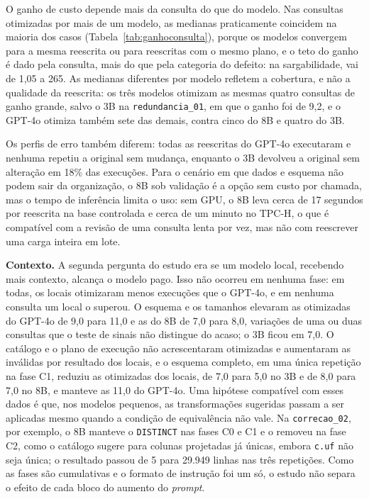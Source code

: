 \documentclass[12pt]{article}
\begin{document}
O ganho de custo depende mais da consulta do que do modelo. Nas consultas otimizadas por mais de um modelo, as medianas praticamente coincidem na maioria dos casos (Tabela~\ref{tab:ganhoconsulta}), porque os modelos convergem para a mesma reescrita ou para reescritas com o mesmo plano, e o teto do ganho é dado pela consulta, mais do que pela categoria do defeito: na sargabilidade, vai de 1,05 a 265. As medianas diferentes por modelo refletem a cobertura, e não a qualidade da reescrita: os três modelos otimizam as mesmas quatro consultas de ganho grande, salvo o 3B na \texttt{redundancia\_01}, em que o ganho foi de 9,2, e o GPT-4o otimiza também sete das demais, contra cinco do 8B e quatro do 3B.

Os perfis de erro também diferem: todas as reescritas do GPT-4o executaram e nenhuma repetiu a original sem mudança, enquanto o 3B devolveu a original sem alteração em 18\% das execuções. Para o cenário em que dados e esquema não podem sair da organização, o 8B sob validação é a opção sem custo por chamada, mas o tempo de inferência limita o uso: sem GPU, o 8B leva cerca de 17 segundos por reescrita na base controlada e cerca de um minuto no TPC-H, o que é compatível com a revisão de uma consulta lenta por vez, mas não com reescrever uma carga inteira em lote.

\textbf{Contexto.} A segunda pergunta do estudo era se um modelo local, recebendo mais contexto, alcança o modelo pago. Isso não ocorreu em nenhuma fase: em todas, os locais otimizaram menos execuções que o GPT-4o, e em nenhuma consulta um local o superou. O esquema e os tamanhos elevaram as otimizadas do GPT-4o de 9,0 para 11,0 e as do 8B de 7,0 para 8,0, variações de uma ou duas consultas que o teste de sinais não distingue do acaso; o 3B ficou em 7,0. O catálogo e o plano de execução não acrescentaram otimizadas e aumentaram as inválidas por resultado dos locais, e o esquema completo, em uma única repetição na fase C1, reduziu as otimizadas dos locais, de 7,0 para 5,0 no 3B e de 8,0 para 7,0 no 8B, e manteve as 11,0 do GPT-4o. Uma hipótese compatível com esses dados é que, nos modelos pequenos, as transformações sugeridas passam a ser aplicadas mesmo quando a condição de equivalência não vale. Na \texttt{correcao\_02}, por exemplo, o 8B manteve o \texttt{DISTINCT} nas fases C0 e C1 e o removeu na fase C2, como o catálogo sugere para colunas projetadas já únicas, embora \texttt{c.uf} não seja única; o resultado passou de 5 para 29.949 linhas nas três repetições. Como as fases são cumulativas e o formato de instrução foi um só, o estudo não separa o efeito de cada bloco do aumento do \textit{prompt}.
\end{document}
